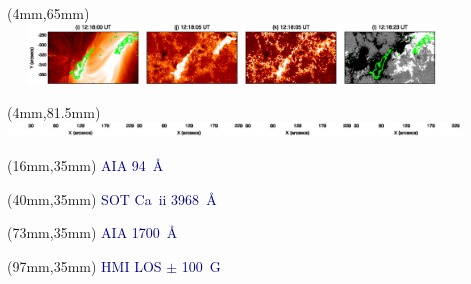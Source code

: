 \documentclass{beamer}
\begin{document}
\begin{frame}
\begin{textblock*}{205mm}(4mm,65mm)
\includegraphics[height = 16mm, width = 120mm]{figs/sig5}
\end{textblock*}
\begin{textblock*}{210mm}(4mm,81.5mm)
\includegraphics[height = 4mm, width = 121mm]{figs/sig6}
\end{textblock*} 
 
\begin{textblock*}{40mm}(16mm,35mm)
\scriptsize \textcolor{darkblue}{AIA 94~{\AA}}
\end{textblock*}
\begin{textblock*}{40mm}(40mm,35mm)
\scriptsize \textcolor{darkblue}{SOT Ca~{\sc ii} 3968~{\AA}}
\end{textblock*} 
  
\begin{textblock*}{40mm}(73mm,35mm)
\scriptsize \textcolor{darkblue}{AIA 1700~{\AA}}
\end{textblock*}
\begin{textblock*}{40mm}(97mm,35mm)
\scriptsize \textcolor{darkblue}{HMI LOS $\pm$ 100~G}
\end{textblock*} 
  
 
\end{frame}



\end{document}
